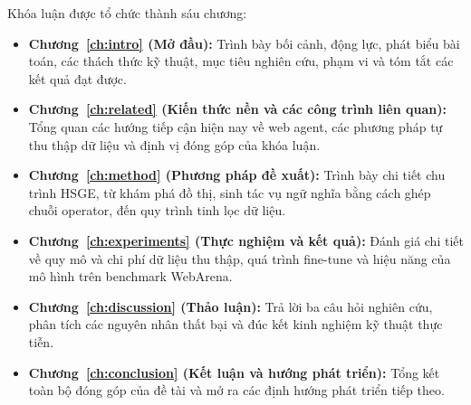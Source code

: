 Khóa luận được tổ chức thành sáu chương:
\begin{itemize}
  \item \textbf{Chương~\ref{ch:intro} (Mở đầu):} Trình bày bối cảnh, động lực, phát biểu bài toán, các thách thức kỹ thuật, mục tiêu nghiên cứu, phạm vi và tóm tắt các kết quả đạt được.
  \item \textbf{Chương~\ref{ch:related} (Kiến thức nền và các công trình liên quan):} Tổng quan các hướng tiếp cận hiện nay về web agent, các phương pháp tự thu thập dữ liệu và định vị đóng góp của khóa luận.
  \item \textbf{Chương~\ref{ch:method} (Phương pháp đề xuất):} Trình bày chi tiết chu trình HSGE, từ khám phá đồ thị, sinh tác vụ ngữ nghĩa bằng cách ghép chuỗi operator, đến quy trình tinh lọc dữ liệu.
  \item \textbf{Chương~\ref{ch:experiments} (Thực nghiệm và kết quả):} Đánh giá chi tiết về quy mô và chi phí dữ liệu thu thập, quá trình fine-tune và hiệu năng của mô hình trên benchmark WebArena.
  \item \textbf{Chương~\ref{ch:discussion} (Thảo luận):} Trả lời ba câu hỏi nghiên cứu, phân tích các nguyên nhân thất bại và đúc kết kinh nghiệm kỹ thuật thực tiễn.
  \item \textbf{Chương~\ref{ch:conclusion} (Kết luận và hướng phát triển):} Tổng kết toàn bộ đóng góp của đề tài và mở ra các định hướng phát triển tiếp theo.
\end{itemize}
